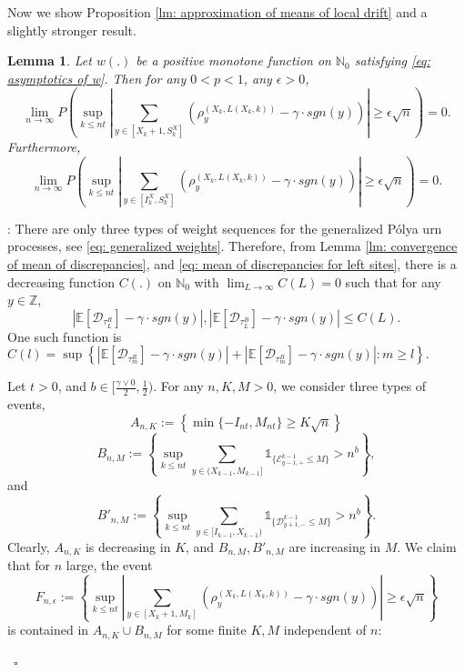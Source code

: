 \documentclass[twoside,12pt,a4paper]{article}
\newtheorem{lemma}{Lemma}[section]
\numberwithin{equation}{section}
\newenvironment{proof}[1][Proof]{{\sc #1}:}{~\hfill $\square$}
\newcommand{\abs}[1]{\left\vert #1 \right\vert}
\begin{document}
		Now we show Proposition \ref{lm: approximation of means of local drift} and a slightly stronger result. 
		\begin{lemma}
			Let $w(.)$ be a positive monotone function on $\mathbb{N}_0$ satisfying \eqref{eq: asymptotics of w}. Then for any $0<p<1$, any $\epsilon>0$,
			$$
			\lim_{n\to\infty} P\left( \sup_{k\leq n t}  \abs{  	\sum_{y\in [X_{k}+1 ,S_{k}^X]} \left( \rho^{(X_k,L(X_k,k))}_y -  \gamma \cdot sgn(y) \right) } \geq  \epsilon \sqrt{n}     \right) =0.
			$$
			Furthermore,
		$$
	\lim_{n\to\infty} P\left( \sup_{k\leq n t}  \abs{  	\sum_{y\in [I_k^{X} ,S_{k}^X]} \left( \rho^{(X_k,L(X_k,k))}_y -  \gamma \cdot sgn(y) \right) } \geq  \epsilon \sqrt{n}     \right) =0.
	$$
\end{lemma}
\begin{proof} There are only three types of weight sequences for the generalized P\'{o}lya urn processes, see \eqref{eq: generalized weights}. Therefore, from Lemma \ref{lm: convergence of mean of discrepancies}, and \eqref{eq: mean of discrepancies for left sites}, there is a decreasing function $C(.)$ on $\mathbb{N}_0$ with $\lim_{L\to \infty}C(L) =0$ such that for any $y \in \mathbb{Z}$,
	\begin{equation}\label{eq: uniform convergence}
		\abs{\mathbb{E}\left[ \mathcal{D}_{\tau_L^R} \right] - \gamma \cdot sgn(y)}, \abs{\mathbb{E}\left[ \mathcal{D}_{\tau_L^B} \right] - \gamma \cdot sgn(y)} \leq C(L).
	\end{equation} One such function is $C(l) = \sup \left\{  \abs{\mathbb{E}\left[ \mathcal{D}_{\tau_m^R} \right] - \gamma \cdot sgn(y)} + \abs{\mathbb{E}\left[ \mathcal{D}_{\tau_m^B} \right] - \gamma \cdot sgn(y)} : m\geq l \right\}.     $  
	
	
	Let $t>0$, and $b \in [\frac{\gamma \vee 0 }{2},\frac{1}{2})$.  For any $n,K,M>0$, we consider three types of events, 
	$$A_{n,K}:=\left\{ \min\{-I_{nt}, M_{nt}\} \geq K \sqrt{n}  \right\}$$
	$$B_{n,M}:= \left\{  \sup_{k\leq n t} \sum_{ y\in (X_{k-1}, M_{k-1}]}  \mathbb{1}_{\{ \mathcal{E}^{k-1}_{y-1,+} \leq M  \}} >n^b  \right\},  $$
	and 
	$$B'_{n,M}:=  \left\{  \sup_{k\leq n t} \sum_{ y\in [I_{k-1}, X_{k-1})}  \mathbb{1}_{\{ \mathcal{D}^{k-1}_{y+1, -} \leq M  \}} >n^b  \right\}.$$
Clearly, $A_{n,K}$ is decreasing in $K$, and $B_{n,M}, B'_{n,M}$ are increasing in $M$. We claim that for $n$ large, the event 
$$
F_{n,\epsilon}:= \left\{ \sup_{k\leq n t}  \abs{  	\sum_{y\in [X_{k}+1 ,M_k]} \left( \rho^{(X_k,L(X_k,k))}_y -  \gamma \cdot sgn(y) \right) } \geq  \epsilon \sqrt{n}    \right \}$$ is contained in $A_{n,K} \cup B_{n,M} $ for some finite $K, M$ independent of $n$:   


\end{proof}
\end{document}
